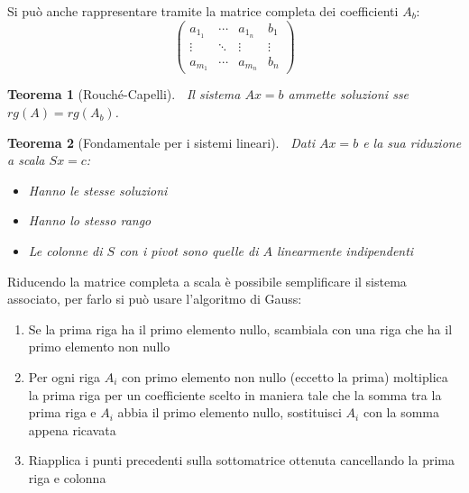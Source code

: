 \documentclass{article}
\newtheorem{theorem}{Teorema}
\begin{document}
\vspace{15pt}

\noindent Si può anche rappresentare tramite la matrice completa dei coefficienti $A_b$:
\[
\left(\begin{array}{ccc|c}
     a_{1_1} & \cdots & a_{1_n} & b_1 \\
     \vdots & \ddots  & \vdots & \vdots\\
     a_{m_1} & \cdots & a_{m_n} & b_n
\end{array}\right)
\]\newline

\begin{theorem}[Rouché-Capelli]$\ $\newline
    Il sistema $Ax=b$ ammette soluzioni sse $rg(A)=rg(A_b)$.\newline
\end{theorem}

\begin{theorem}[Fondamentale per i sistemi lineari]$\ $\newline
    Dati $Ax=b$ e la sua riduzione a scala $Sx=c$:
    \begin{itemize}
        \item Hanno le stesse soluzioni
        \item Hanno lo stesso rango
        \item Le colonne di $S$ con i pivot sono quelle di $A$ linearmente indipendenti\newline
    \end{itemize}
    
\end{theorem}

\newpage

\noindent Riducendo la matrice completa a scala è possibile semplificare il sistema associato, per farlo si può usare l'algoritmo di Gauss:
\begin{enumerate}
    \item Se la prima riga ha il primo elemento nullo, scambiala con una riga che ha il primo elemento non nullo
    \item Per ogni riga $A_i$ con primo elemento non nullo (eccetto la prima) moltiplica la prima riga per un coefficiente scelto in maniera tale che la somma tra la prima riga e $A_i$ abbia il primo elemento nullo, sostituisci $A_i$ con la somma appena ricavata
    \item Riapplica i punti precedenti sulla sottomatrice ottenuta cancellando la prima riga e colonna\newline
\end{enumerate}
\end{document}
